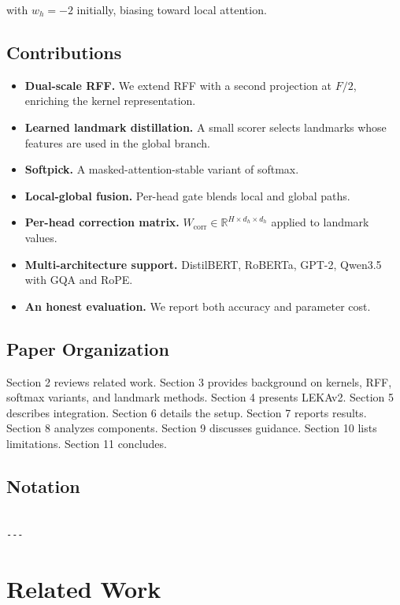 with $w_h = -2$ initially, biasing toward local attention.

\subsection{Contributions}

\begin{itemize}
\item \textbf{Dual-scale RFF.} We extend RFF with a second projection at $F/2$,
  enriching the kernel representation.
\item \textbf{Learned landmark distillation.} A small scorer selects landmarks
  whose features are used in the global branch.
\item \textbf{Softpick.} A masked-attention-stable variant of softmax.
\item \textbf{Local-global fusion.} Per-head gate blends local and global paths.
\item \textbf{Per-head correction matrix.} $W_\text{corr} \in \mathbb{R}^{H \times d_h \times d_h}$
  applied to landmark values.
\item \textbf{Multi-architecture support.} DistilBERT, RoBERTa, GPT-2, Qwen3.5
  with GQA and RoPE.
\item \textbf{An honest evaluation.} We report both accuracy and parameter cost.

\end{itemize}
\subsection{Paper Organization}

Section 2 reviews related work. Section 3 provides background on kernels, 
RFF, softmax variants, and landmark methods. Section 4 presents LEKAv2. 
Section 5 describes integration. Section 6 details the setup. Section 7 
reports results. Section 8 analyzes components. Section 9 discusses 
guidance. Section 10 lists limitations. Section 11 concludes.



\subsection{Notation}

\begin{lstlisting}

---
\end{lstlisting}

\section{Related Work}

